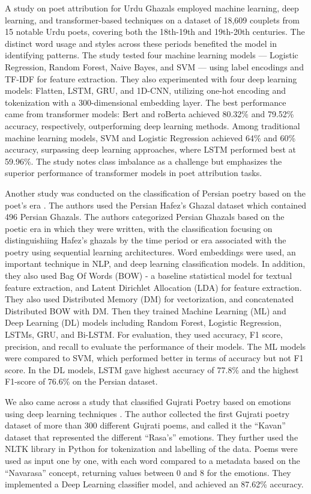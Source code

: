 A study on poet attribution for Urdu Ghazals \cite{fizza_iqra_urdu_attribution} employed machine learning, deep learning, and transformer-based techniques on a dataset of 18,609 couplets from 15 notable Urdu poets, covering both the 18th-19th and 19th-20th centuries. The distinct word usage and styles across these periods benefited the model in identifying patterns. The study tested four machine learning models — Logistic Regression, Random Forest, Naive Bayes, and SVM — using label encodings and TF-IDF for feature extraction. They also experimented with four deep learning models: Flatten, LSTM, GRU, and 1D-CNN, utilizing one-hot encoding and tokenization with a 300-dimensional embedding layer. The best performance came from transformer models: Bert and roBerta achieved 80.32\% and 79.52\% accuracy, respectively, outperforming deep learning methods. Among traditional machine learning models, SVM and Logistic Regression achieved 64\% and 60\% accuracy, surpassing deep learning approaches, where LSTM performed best at 59.96\%. The study notes class imbalance as a challenge but emphasizes the superior performance of transformer models in poet attribution tasks.

Another study was conducted on the classification of Persian poetry based on the poet's era \cite{persian_poetry_classification}. The authors used the Persian Hafez's Ghazal dataset which contained 496 Persian Ghazals. The authors categorized Persian Ghazals based on the poetic era in which they were written, with the classification focusing on distinguishiing Hafez's ghazals by the time period or era associated with the poetry using sequential learning architectures. Word embeddings were used, an important technique in NLP, and deep learning classification models. In addition, they also used Bag Of Words (BOW) - a baseline statistical model for textual feature extraction, and Latent Dirichlet Allocation (LDA) for feature extraction. They also used Distributed Memory (DM) for vectorization, and concatenated Distributed BOW with DM. Then they trained Machine Learning (ML) and Deep Learning (DL) models including Random Forest, Logistic Regression, LSTMs, GRU, and Bi-LSTM. For evaluation, they used accuracy, F1 score, precision, and recall to evaluate the performance of their models. The ML models were compared to SVM, which performed better in terms of accuracy but not F1 score. In the DL models, LSTM gave highest accuracy of 77.8\% and the highest F1-score of 76.6\% on the Persian dataset.  

We also came across a study that classified Gujrati Poetry based on emotions using deep learning techniques \cite{gujrati_poetry_attribution}. The author collected the first Gujrati poetry dataset of more than 300 different Gujrati poems, and called it the ``Kavan'' dataset that represented the different ``Rasa's'' emotions. They further used the NLTK library in Python for tokenization and labelling of the data. Poems were used as input one by one, with each word compared to a metadata based on the ``Navarasa'' concept, returning values between 0 and 8 for the emotions. They implemented a Deep Learning classifier model, and achieved an 87.62\% accuracy. 

